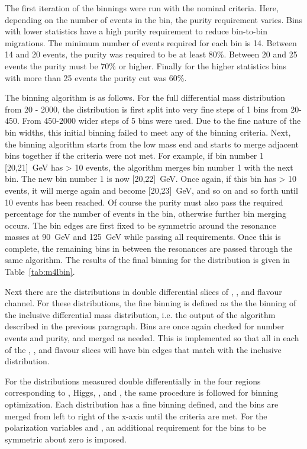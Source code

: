 The first iteration of the binnings were run with the nominal criteria. Here, depending on the number of events in the bin, the purity requirement varies. Bins with lower statistics have a high purity requirement to reduce bin-to-bin migrations. The minimum number of events required for each bin is 14. Between 14 and 20 events, the purity was required to be at least 80\%. Between 20 and 25 events the purity must be 70\% or higher. Finally for the higher statistics bins with more than 25 events the purity cut was 60\%. 

The binning algorithm is as follows. For the full \mFourL{} differential mass distribution from \unit{20}{\Gev} - \unit{2000}{\GeV}, the distribution is first split into very fine steps of \unit{1}{\GeV} bins from \unit{20}{\Gev}-\unit{450}{\GeV}. From \unit{450}{\Gev}-\unit{2000}{\GeV} wider steps of \unit{5}{\GeV} bins were used. Due to the fine nature of the bin widths, this initial binning failed to meet any of the binning criteria. Next, the binning algorithm starts from the low mass end and starts to merge adjacent bins together if the criteria were not met. For example, if bin number 1 [20,21]~GeV has > 10 events, the algorithm merges bin number 1 with the next bin. The new bin number 1 is now [20,22]~GeV. Once again, if this bin has > 10 events, it will merge again and become [20,23]~GeV, and so on and so forth until 10 events has been reached. Of course the purity must also pass the required percentage for the number of events in the bin, otherwise further bin merging occurs. The bin edges are first fixed to be symmetric around the resonance masses at 90~GeV and 125~GeV while passing all requirements. Once this is complete, the remaining bins in between the resonances are passed through the same algorithm. The results of the final binning for the \mFourL{} distribution is given in Table~\ref{tab:m4lbin}.

Next there are the \mFourL{} distributions in double differential slices of \ptFourL, \yFourL, and flavour channel. For these distributions, the fine binning is defined as the the binning of the inclusive \mFourL{} differential mass distribution, i.e. the output of the algorithm described in the previous paragraph. Bins are once again checked for number events and purity, and merged as needed. This is implemented so that all \mFourL{} in each of the  \ptFourL, \yFourL, and flavour slices will have bin edges that match with the inclusive distribution. 

For the distributions measured double differentially in the four \mFourL{} regions corresponding to \Z, Higgs, \onshellZZ, and \offshellZZ, the same procedure is followed for binning optimization. Each distribution has a fine binning defined, and the bins are merged from left to right of the x-axis until the criteria are met. For the polarization variables \CTSOneTwo and \CTSThreeFour, an additional requirement for the bins to be symmetric about zero is imposed.

